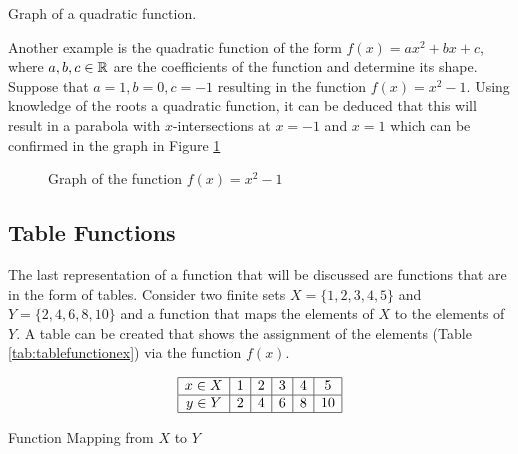 \begin{example} Graph of a quadratic function.

    Another example is the quadratic function of the form $f(x) = ax^2 + bx + c$, where $a,b,c \in \mathbb{R}$ are the coefficients of the function and determine its shape. Suppose that $a = 1, b = 0, c = -1$ resulting in the function $f(x) = x^2 - 1$. Using knowledge of the roots a quadratic function, it can be deduced that this will result in a parabola with $x$-intersections at $x = -1$ and $x = 1$ which can be confirmed in the graph in Figure \ref{f(x)=x^2-1graph}

    \begin{figure}[!ht]
        \centering
        \label{f(x)=x^2-1graph}
        \caption{Graph of the function $f(x) = x^2-1$}
    \end{figure}
\end{example}

\subsection{Table Functions}

The last representation of a function that will be discussed are functions that are in the form of tables. Consider two finite sets $X = \{1,2,3,4,5\}$ and $Y = \{2,4,6,8,10\}$ and a function that maps the elements of $X$ to the elements of $Y$. A table can be created that shows the assignment of the elements (Table \ref{tab:tablefunctionex}) via the function $f(x)$.

\begin{table}[!ht]
    \centering
    \[
        \begin{array}{|*{6}{c|}}
            \hline
            x \in X & 1 & 2 & 3 & 4 & 5 \\
            \hline
            y \in Y & 2 & 4 & 6 & 8 & 10 \\
            \hline
        \end{array}
    \]
    \caption{Function Mapping from \( X \) to \( Y \)}
    \label{tab:tablefunctionex}
\end{table}


